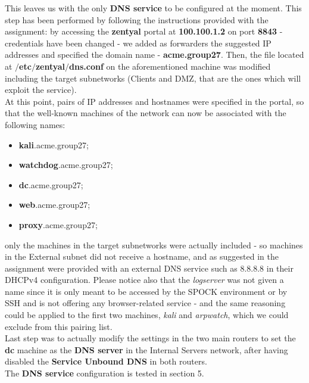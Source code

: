 This leaves us with the only \textbf{DNS service} to be configured at the moment. This step has been performed by following the instructions provided with the assignment: by accessing the \textbf{zentyal} portal at \textbf{100.100.1.2} on port \textbf{8843} - credentials have been changed - we added as forwarders the suggested IP addresses and specified the domain name - \textbf{acme.group27}. Then, the file located at \textbf{$/$etc$/$zentyal$/$dns.conf} on the aforementioned machine was modified including the target subnetworks (Clients and DMZ, that are the ones which will exploit the service).\\
At this point, pairs of IP addresses and hostnames were specified in the portal, so that the well-known machines of the network can now be associated with the following names:\\
\begin{itemize}
\item \textbf{kali}.acme.group27;
\item \textbf{watchdog}.acme.group27;
\item \textbf{dc}.acme.group27;
\item \textbf{web}.acme.group27;
\item \textbf{proxy}.acme.group27;
\end{itemize}

only the machines in the target subnetworks were actually included - so machines in the External subnet did not receive a hostname, and as suggested in the assignment were provided with an external DNS service such as 8.8.8.8 in their DHCPv4 configuration. Please notice also that the \textit{logserver} was not given a name since it is only meant to be accessed by the SPOCK environment or by SSH and is not offering any browser-related service - and the same reasoning could be applied to the first two machines, \textit{kali} and \textit{arpwatch}, which we could exclude from this pairing list.\\
Last step was to actually modify the  settings in the two main routers to set the \textbf{dc} machine as the \textbf{DNS server} in the Internal Servers network, after having disabled the \textbf{Service Unbound DNS} in both routers.\\
The \textbf{DNS service} configuration is tested in section 5.
